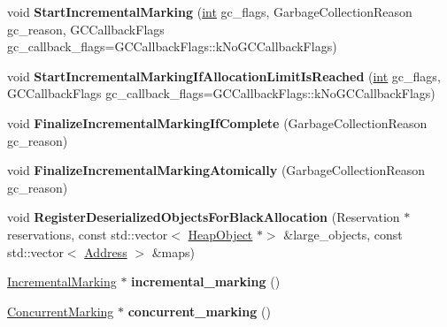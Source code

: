 \begin{DoxyCompactItemize}
\item 
\mbox{\label{classv8_1_1internal_1_1Heap_ade783538f53dbd4f52b65b35ed405fd6}} 
void {\bfseries Start\+Incremental\+Marking} (\mbox{\hyperlink{classint}{int}} gc\+\_\+flags, Garbage\+Collection\+Reason gc\+\_\+reason, G\+C\+Callback\+Flags gc\+\_\+callback\+\_\+flags=G\+C\+Callback\+Flags\+::k\+No\+G\+C\+Callback\+Flags)
\item 
\mbox{\label{classv8_1_1internal_1_1Heap_a0219dfe614f94d23de67b5f6ab07c74a}} 
void {\bfseries Start\+Incremental\+Marking\+If\+Allocation\+Limit\+Is\+Reached} (\mbox{\hyperlink{classint}{int}} gc\+\_\+flags, G\+C\+Callback\+Flags gc\+\_\+callback\+\_\+flags=G\+C\+Callback\+Flags\+::k\+No\+G\+C\+Callback\+Flags)
\item 
\mbox{\label{classv8_1_1internal_1_1Heap_aca391193637467408b21e35f4d73633d}} 
void {\bfseries Finalize\+Incremental\+Marking\+If\+Complete} (Garbage\+Collection\+Reason gc\+\_\+reason)
\item 
\mbox{\label{classv8_1_1internal_1_1Heap_a114d59b1a17d33863f80eda53b14d32d}} 
void {\bfseries Finalize\+Incremental\+Marking\+Atomically} (Garbage\+Collection\+Reason gc\+\_\+reason)
\item 
\mbox{\label{classv8_1_1internal_1_1Heap_acacfe27c3505bcbf8297ad103563402d}} 
void {\bfseries Register\+Deserialized\+Objects\+For\+Black\+Allocation} (Reservation $\ast$reservations, const std\+::vector$<$ \mbox{\hyperlink{classv8_1_1internal_1_1HeapObject}{Heap\+Object}} $\ast$$>$ \&large\+\_\+objects, const std\+::vector$<$ \mbox{\hyperlink{classuintptr__t}{Address}} $>$ \&maps)
\item 
\mbox{\label{classv8_1_1internal_1_1Heap_ab22cdb999c73da6215619ad67bbd13d4}} 
\mbox{\hyperlink{classv8_1_1internal_1_1IncrementalMarking}{Incremental\+Marking}} $\ast$ {\bfseries incremental\+\_\+marking} ()
\item 
\mbox{\label{classv8_1_1internal_1_1Heap_a69c0288b7bb246d4207d09c4e6eef992}} 
\mbox{\hyperlink{classv8_1_1internal_1_1ConcurrentMarking}{Concurrent\+Marking}} $\ast$ {\bfseries concurrent\+\_\+marking} ()
$$
\end{DoxyCompactItemize}
